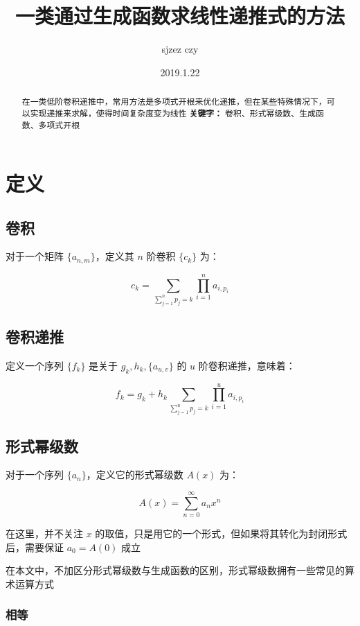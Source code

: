 \documentclass[UTF8]{article}
\author {sjzez czy}
\title {一类通过生成函数求线性递推式的方法}
\date{2019.1.22}
\begin{document}
\maketitle

\begin{abstract}
    在一类低阶卷积递推中，常用方法是多项式开根来优化递推，但在某些特殊情况下，可以实现递推来求解，使得时间复杂度变为线性
    \newline
    \centering
    \textbf{关键字：} 卷积、形式幂级数、生成函数、多项式开根
\end{abstract}

\newpage
\tableofcontents

\newpage

\section{定义}

\subsection{卷积}

对于一个矩阵 $\{a_{n,m}\}$，定义其 $n$ 阶卷积 $\{c_k\}$ 为：

$$
c_k=\sum_{\sum_{j=1}^{n}p_j=k}\prod_{i=1}^{n} a_{i,p_i}
$$

\subsection{卷积递推}

定义一个序列 $\{f_k\}$ 是关于 $g_k,h_k,\{a_{u,v}\}$ 的 $u$ 阶卷积递推，意味着：

$$
f_k=g_k+h_k\sum_{\sum_{j=1}^{u}p_j=k}\prod_{i=1}^{u}a_{i,p_i}
$$

\subsection{形式幂级数}

对于一个序列 $\{a_n\}$，定义它的形式幂级数 $A(x)$ 为：

$$
A(x)=\sum_{n=0}^{\infty}a_nx^n
$$

在这里，并不关注 $x$ 的取值，只是用它的一个形式，但如果将其转化为封闭形式后，需要保证 $a_0=A(0)$ 成立

在本文中，不加区分形式幂级数与生成函数的区别，形式幂级数拥有一些常见的算术运算方式

\subsubsection{相等}
\end{document}
